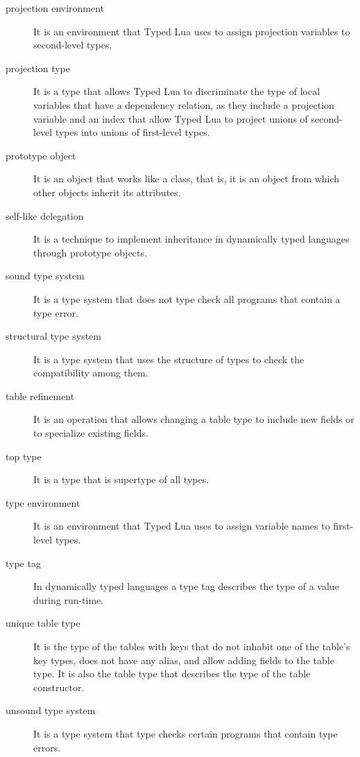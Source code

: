 \begin{description}
\item[projection environment] It is an environment that Typed Lua uses to assign projection variables to
second-level types.

\item[projection type] It is a type that allows Typed Lua to discriminate the type of local variables
that have a dependency relation, as they include a projection variable and an
index that allow Typed Lua to project unions of second-level types into
unions of first-level types.

\item[prototype object] It is an object that works like a class, that is, it is an object from
which other objects inherit its attributes.

\item[self-like delegation] It is a technique to implement inheritance in dynamically typed languages
through prototype objects. 

\item[sound type system] It is a type system that does not type check all programs that contain a type error.

\item[structural type system] It is a type system that uses the structure of types to check the compatibility among them.

\item[table refinement] It is an operation that allows changing a table type to include new fields or
to specialize existing fields.

\item[top type] It is a type that is supertype of all types.

\item[type environment] It is an environment that Typed Lua uses to assign variable names to first-level types.

\item[type tag] In dynamically typed languages a type tag describes the type of a value during
run-time.

\item[unique table type] It is the type of the tables with keys that do not inhabit one of
the table's key types, does not have any alias, and allow adding
fields to the table type.
It is also the table type that describes the type of the table constructor.

\item[unsound type system] It is a type system that type checks certain programs that contain type errors.


\end{description}
